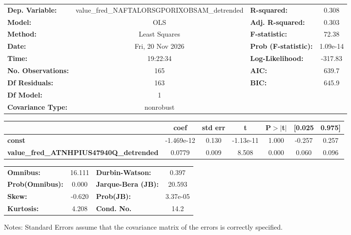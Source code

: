 \begin{center}
\begin{tabular}{lclc}
\toprule
\textbf{Dep. Variable:}                         & value\_fred\_NAFTALORSGPORIXOBSAM\_detrended & \textbf{  R-squared:         } &     0.308   \\
\textbf{Model:}                                 &                     OLS                      & \textbf{  Adj. R-squared:    } &     0.303   \\
\textbf{Method:}                                &                Least Squares                 & \textbf{  F-statistic:       } &     72.38   \\
\textbf{Date:}                                  &               Fri, 20 Nov 2026               & \textbf{  Prob (F-statistic):} &  1.09e-14   \\
\textbf{Time:}                                  &                   19:22:34                   & \textbf{  Log-Likelihood:    } &   -317.83   \\
\textbf{No. Observations:}                      &                       165                    & \textbf{  AIC:               } &     639.7   \\
\textbf{Df Residuals:}                          &                       163                    & \textbf{  BIC:               } &     645.9   \\
\textbf{Df Model:}                              &                         1                    & \textbf{                     } &             \\
\textbf{Covariance Type:}                       &                  nonrobust                   & \textbf{                     } &             \\
\bottomrule
\end{tabular}
\begin{tabular}{lcccccc}
                                                & \textbf{coef} & \textbf{std err} & \textbf{t} & \textbf{P$> |$t$|$} & \textbf{[0.025} & \textbf{0.975]}  \\
\midrule
\textbf{const}                                  &   -1.469e-12  &        0.130     & -1.13e-11  &         1.000        &       -0.257    &        0.257     \\
\textbf{value\_fred\_ATNHPIUS47940Q\_detrended} &       0.0779  &        0.009     &     8.508  &         0.000        &        0.060    &        0.096     \\
\bottomrule
\end{tabular}
\begin{tabular}{lclc}
\textbf{Omnibus:}       & 16.111 & \textbf{  Durbin-Watson:     } &    0.397  \\
\textbf{Prob(Omnibus):} &  0.000 & \textbf{  Jarque-Bera (JB):  } &   20.593  \\
\textbf{Skew:}          & -0.620 & \textbf{  Prob(JB):          } & 3.37e-05  \\
\textbf{Kurtosis:}      &  4.208 & \textbf{  Cond. No.          } &     14.2  \\
\bottomrule
\end{tabular}
\end{center}

Notes: \newline
 [1] Standard Errors assume that the covariance matrix of the errors is correctly specified.